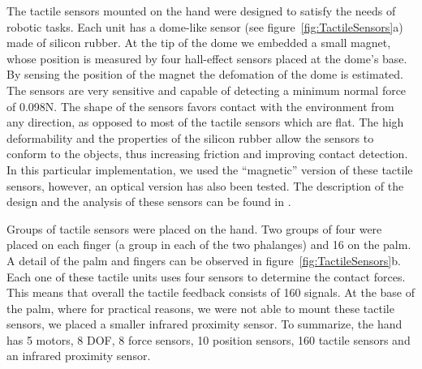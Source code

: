 %
The tactile sensors mounted on the hand were designed to satisfy the
needs of robotic tasks. Each unit has a dome-like sensor (see
figure~\ref{fig:TactileSensors}a) made of silicon rubber. At the
tip of the dome we embedded a small magnet, whose position is
measured by four hall-effect sensors placed at the dome's base. By
sensing the position of the magnet the defomation of the dome
is estimated. The sensors are very sensitive and capable of 
detecting a minimum normal force of 0.098N. The shape of the sensors 
favors contact with the environment from any direction, as 
opposed to most of the tactile sensors which are
flat. The high deformability and the properties of the silicon
rubber allow the sensors to conform to the objects, thus
increasing friction and improving contact detection. In this
particular implementation, we used the ``magnetic'' version of
these tactile sensors, however, an optical version has also been
tested. The description of the design and the analysis of these
sensors can be found in \cite{etorresjSoft}.

Groups of tactile sensors were placed on the hand. Two groups of
four were placed on each finger (a group in each of the two
phalanges) and 16 on the palm. A detail of the palm and fingers
can be observed in figure~\ref{fig:TactileSensors}b. Each one of
these tactile units uses four sensors to determine the contact
forces. This means that overall the tactile feedback consists of
160 signals. At the base of the palm, where for practical reasons,
we were not able to mount these tactile sensors, we placed a
smaller infrared proximity sensor. To summarize, the hand has 5
motors, 8 DOF, 8 force sensors, 10 position sensors, 160 tactile
sensors and an infrared proximity sensor.


